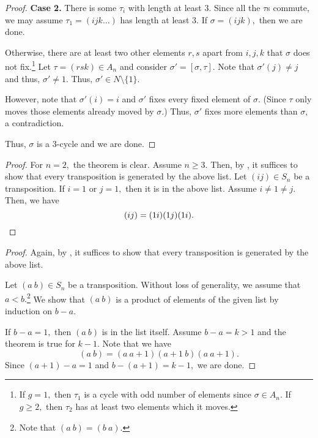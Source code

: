 \begin{proof}
    \textbf{Case 2.} There is some $\tau_i$ with length at least $3.$ Since all the $\tau$s commute, we may assume $\tau_1 = (i j k \ldots)$ has length at least $3.$ If $\sigma = (i j k),$ then we are done.

    Otherwise, there are at least two other elements $r , s$ apart from $i, j, k$ that $\sigma$ does not fix.\footnote{If $g = 1,$ then $\tau_1$ is a cycle with odd number of elements since $\sigma \in A_n.$ If $g \ge 2,$ then $\tau_2$ has at least two elements which it moves.} Let $\tau = (r s k) \in A_n$ and consider $\sigma' = [\sigma, \tau].$ Note that $\sigma'(j) \neq j$ and thus, $\sigma' \neq 1.$ Thus, $\sigma' \in N \setminus \{1\}.$

    However, note that $\sigma'(i) = i$ and $\sigma'$ fixes every fixed element of $\sigma.$ (Since $\tau$ only moves those elements already moved by $\sigma.$) Thus, $\sigma'$ fixes more elements than $\sigma,$ a contradiction.

    Thus, $\sigma$ is a $3$-cycle and we are done.
\end{proof}

\genconsectranpose*\label{thm:genconsectranpose2}
\begin{flushright}\hyperref[thm:genconsectranpose]{\upsym}\end{flushright}
\begin{proof}
    For $n = 2,$ the theorem is clear. Assume $n \ge 3.$ Then, by , it suffices to show that every transposition is generated by the above list. Let $(ij) \in S_n$ be a transposition. If $i = 1$ or $j = 1,$ then it is in the above list. Assume $i \neq 1 \neq j.$ Then, we have
    \begin{equation*} 
        (ij) = (1i)(1j)(1i). \qedhere
    \end{equation*}
\end{proof}

\genconsectranposespecial*\label{thm:genconsectranposespecial2}
\begin{flushright}\hyperref[thm:genconsectranposespecial]{\upsym}\end{flushright}
\begin{proof}
    Again, by , it suffices to show that every transposition is generated by the above list.

    Let $(a \ b) \in S_n$ be a transposition. Without loss of generality, we assume that $a < b.$\footnote{Note that $(a \ b) = (b \ a).$} We show that $(a \ b)$ is a product of elements of the given list by induction on $b - a.$

    If $b - a = 1,$ then $(a \ b)$ is in the list itself. Assume $b - a = k > 1$ and the theorem is true for $k - 1.$ Note that we have
    \begin{equation*} 
        (a \ b) = (a \ a + 1)(a + 1 \ b)(a \ a + 1).
    \end{equation*}
    Since $(a + 1) - a = 1$ and $b - (a + 1) = k - 1,$ we are done.
\end{proof}

